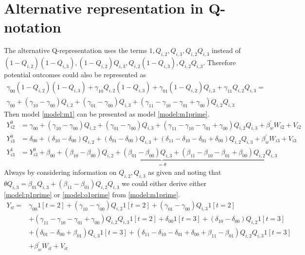 \documentclass[12pt]{article}
\begin{document}
\section{Alternative representation in Q-notation}\label{appendix:altern:present}
The alternative Q-representation uses the terms $1, Q_{i,2},Q_{i,3}, Q_{i,2}Q_{i,3}$ instead of $(1-Q_{i,2})(1-Q_{i,3}), (1-Q_{i,2})Q_{i,3}, Q_{i,2}(1-Q_{i,3}), Q_{i,2}Q_{i,3}$. Therefore potential outcomes could also be represented as
\begin{multline*}
\gamma_{00}(1-Q_{i,2})(1-Q_{i,3}) + \gamma_{10}Q_{i,2}(1-Q_{i,3}) + \gamma_{01}(1-Q_{i,2})Q_{i,3}  + \gamma_{11}Q_{i,2}Q_{i,3} = \\
\gamma_{00} + (\gamma_{10}-\gamma_{00})Q_{i,2} + (\gamma_{01}-\gamma_{00})Q_{i,3} + (\gamma_{11}-\gamma_{10}-\gamma_{01} +\gamma_{00})Q_{i,2}Q_{i,3}
\end{multline*}
Then model \ref{model:m1} can be presented as model \ref{model:m1prime}.
\begin{align*}\label{model:m1prime}
Y_{i2}^0 & = \gamma_{00} + (\gamma_{10}-\gamma_{00})Q_{i,2} + (\gamma_{01}-\gamma_{00})Q_{i,3} + (\gamma_{11}-\gamma_{10}-\gamma_{01} +\gamma_{00})Q_{i,2}Q_{i,3} + \beta_w^\prime W_{i2} + V_{i2}\\ 
Y_{i3}^0 & = \delta_{00} + (\delta_{10}-\delta_{00})Q_{i,2} + (\delta_{01}-\delta_{00})Q_{i,3} + (\delta_{11}-\delta_{10}-\delta_{01} +\delta_{00})Q_{i,2}Q_{i,3} + \beta_w^\prime W_{i3} + V_{i3}\\ 
Y_{i3}^1  & = Y_{i3}^0 +\underset{=\theta}{\underbrace{\beta_{00} + (\beta_{10}-\beta_{00})Q_{i,2} + (\beta_{01}-\beta_{00})Q_{i,3} + (\beta_{11}-\beta_{10}-\beta_{01} +\beta_{00})Q_{i,2}Q_{i,3}}} \tag{$M_1^\prime$}
\end{align*}
Always by considering information on $Q_{i,2}, Q_{i,3}$ as given and noting that $\theta Q_{i,3} = \beta_{01}  Q_{i,3} + (\beta_{11}-\beta_{01})Q_{i,2}Q_{i,3}$ we could either derive either \ref{model:p1prime} or \ref{model:o1prime} from \ref{model:m1prime}. 
\begin{align*} \label{model:p1prime}
Y_{it}  = & \gamma_{00}1[t=2] + (\gamma_{10}-\gamma_{00})Q_{i,2}1[t=2] + (\gamma_{01}-\gamma_{00})Q_{i,3}1[t=2] \\
& + (\gamma_{11}-\gamma_{10}-\gamma_{01} +\gamma_{00})Q_{i,2}Q_{i,3}1[t=2] + \delta_{00}1[t=3] + (\delta_{10}-\delta_{00})Q_{i,2}1[t=3] \\
&  + (\delta_{01}-\delta_{00}+\beta_{01})Q_{i,3}1[t=3] + (\delta_{11}-\delta_{10}-\delta_{01} +\delta_{00}+\beta_{11}-\beta_{01})Q_{i,2}Q_{i,3}1[t=3]\\
& + \beta_w^\prime W_{it} + V_{it} \tag{$P_1^\prime$}
\end{align*}
\end{document}
